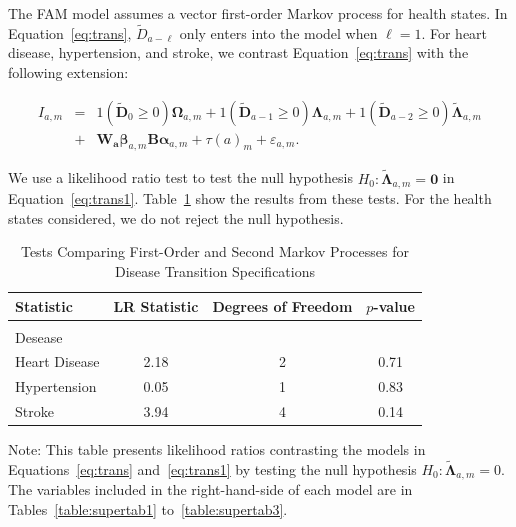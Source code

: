\noindent The FAM model assumes a vector first-order Markov process for health states. In Equation~\eqref{eq:trans}, $\tilde{D}_{a - \ell}$ only enters into the model when $\ell = 1$. For heart disease, hypertension, and stroke, we contrast Equation~\eqref{eq:trans} with the following extension: 

\begin{eqnarray}
I_{a,m} &=& \bm{\mathit{1}} \left( \tilde{\bm{D}}_{0} \geq 0 \right) \bm{\Omega}_{a,m} + \bm{\mathit{1}} \left( \tilde{\bm{D}}_{a-1} \geq 0\right) \bm{\Lambda}_{a,m}  + \bm{\mathit{1}} \left( \tilde{\bm{D}}_{a-2} \geq 0\right) \tilde{\bm{\Lambda}}_{a,m} \nonumber \\ 
&+&  \bm{W_a} \bm{\beta}_{a,m}  \bm{B} \bm{\alpha}_{a,m} + \tau \left( a \right)_{m} + \varepsilon_{a,m}. \label{eq:trans1}
\end{eqnarray}

We use a likelihood ratio test to test the null hypothesis $H_0: \tilde{\bm{\Lambda}}_{a,m} = \bm{0}$ in Equation~\eqref{eq:trans1}. Table~\ref{table:lrtests} show the results from these tests. For the health states considered, we do not reject the null hypothesis.

\begin{table}[H]
\begin{threeparttable}
\caption{Tests Comparing First-Order and Second Markov Processes for Disease Transition Specifications} \label{table:lrtests}
\centering
\footnotesize
\begin{tabular}{lccc}
\toprule
Statistic & LR Statistic & Degrees of Freedom & $p$-value \\
\midrule \\
Desease & \\
Heart Disease & 2.18 & 2 & 0.71 \\
Hypertension   & 0.05 & 1 & 0.83 \\
Stroke              & 3.94 & 4 & 0.14 \\
\bottomrule
\end{tabular}
\begin{tablenotes}
\footnotesize
\item Note: This table presents likelihood ratios contrasting the models in Equations~\ref{eq:trans} and~\eqref{eq:trans1} by testing the null hypothesis $H_0: \tilde{\bm{\Lambda}}_{a,m}=0$. The variables included in the right-hand-side of each model are in Tables~\ref{table:supertab1} to~\ref{table:supertab3}. 
\end{tablenotes}
\end{threeparttable}
\end{table}

